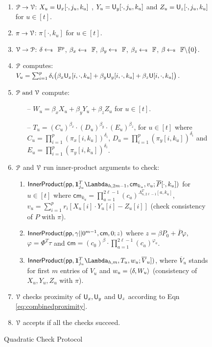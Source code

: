\begin{figure}[h!]
{\begin{framed}
\begin{enumerate}[{\rm 1.}]
				\item $\prover\rightarrow\verifier$: $X_u=\ewit_x[\cdot,j_u,k_u]$ , $Y_u=\ewit_y[\cdot,j_u,k_u]$ and $Z_u=\ewit_z[\cdot,j_u,k_u]$ for $u\in [t]$.
				\item $\pi\rightarrow\verifier$: $\pi[\cdot,k_u]$ for $u\in [t]$.
				\item $\verifier\rightarrow\prover$: $\delta \sample \FF^p$, $\beta_x\sample \FF$, $\beta_y\sample \FF$, $\beta_z\sample \FF$, $\beta \sample \FF \backslash \{0\}$.
				\item $\prover$ computes: $V_u=\sum_{i=1}^p\delta_i\big(\beta_x\ewit_x[i,\cdot,k_u]+\beta_y\ewit_y[i,\cdot,k_u]+\beta_z\ewit[i,\cdot,k_u]\big)$.
				\item $\prover \text{ and }\verifier$ compute:
				\begin{itemize}
					\item[--] $W_u=\beta_xX_u+\beta_yY_u+\beta_zZ_u$ for $u\in [t]$.
					\item[--] $T_u=(C_u)^{\beta_x}\cdot(D_u)^{\beta_y}\cdot(E_u)^{\beta_z}$, for $u\in [t]$ where $C_u=\prod_{i=1}^{p}(\pi_x[i,k_u])^{\delta_i}$, $D_u=\prod_{i=1}^{p}(\pi_y[i,k_u])^{\delta_i}$ and $E_u=\prod_{i=1}^{p}(\pi_y[i,k_u])^{\delta_i}$.
				\end{itemize}
				\item $\prover$ and $\verifier$ run inner-product arguments to check:
				\begin{enumerate}
					\item $\innerproduct(\mathsf{pp},\bm{1}_{j_u}^T\Lambda_{h,2m-1},\mathsf{cm}_{k_u},v_u;\overline{P}[\cdot,k_u])$ for $u\in [t]$ where $\mathsf{cm}_{k_u}=\prod_{a=1}^{2\ell-1}(c_a)^{\Lambda_{n,2\ell-1}^T[a,k_u]}$, $v_u=\sum_{i=1}^p r_i[X_u[i]\cdot Y_u[i] - Z_u[i]]$ (check consistency of $P$ with $\pi$).
					\item $\innerproduct(\mathsf{pp},\gamma||0^{m-1},\mathsf{cm},0;z)$ where $z=\beta P_0 +\overline{P}\varphi$, $\varphi = \Phi^T\tau$ and	$\mathsf{cm} =  (c_0)^{\beta}\cdot\prod_{a=1}^{2\ell-1} (c_a)^{\varphi_a}$.
					\item $\innerproduct(\mathsf{pp},\bm{1}_{j_u}^T\Lambda_{h,m},T_u,w_u;\overline{V}_u])$, where $\overline{V}_u$ stands for first $m$ entries of $V_u$ and $w_u = \innp{\delta}{W_u}$ (consistency of $X_u, Y_u, Z_u$ with $\pi$). 
				\end{enumerate}
				\item $\verifier$ checks proximity of $\ewit_x,\ewit_y$	and $\ewit_z$ according to Eqn \eqref{eq:combinedproximity}.
				\item $\verifier$ accepts if all the checks succeed.
			\end{enumerate}
		\end{framed}
		\caption{Quadratic Check Protocol}
		\label{fig:quadcheck}
	}
\end{figure}
